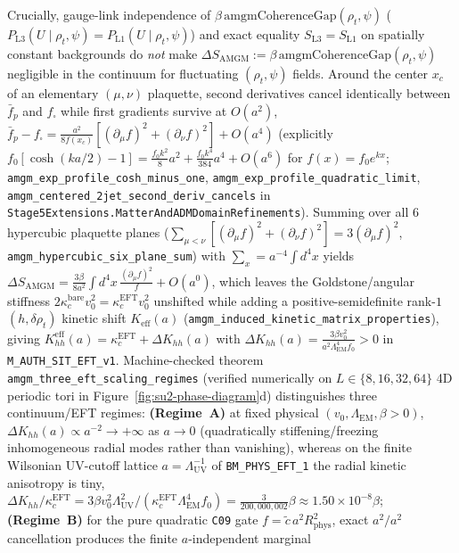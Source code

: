 \begin{enumerate}[leftmargin=2em]
\end{enumerate}

Crucially, gauge-link independence of $\beta\,\mathrm{amgmCoherenceGap}(\rho_t,\psi)$ ($P_{\mathrm{L3}}(U\mid\rho_t,\psi) = P_{\mathrm{L1}}(U\mid\rho_t,\psi)$) and exact equality $S_{\mathrm{L3}} = S_{\mathrm{L1}}$ on spatially constant backgrounds do \emph{not} make $\Delta S_{\mathrm{AMGM}} := \beta\,\mathrm{amgmCoherenceGap}(\rho_t,\psi)$ negligible in the continuum for fluctuating $(\rho_t,\psi)$ fields. Around the center $x_c$ of an elementary $(\mu,\nu)$ plaquette, second derivatives cancel identically between $\bar{f}_p$ and $f_\square$ while first gradients survive at $O(a^2)$, $\bar{f}_p - f_\square = \frac{a^2}{8 f(x_c)}[(\partial_\mu f)^2 + (\partial_\nu f)^2] + O(a^4)$ (explicitly $f_0[\cosh(ka/2)-1] = \frac{f_0 k^2}{8}a^2 + \frac{f_0 k^4}{384}a^4 + O(a^6)$ for $f(x)=f_0 e^{kx}$; \texttt{amgm\_\allowbreak{}exp\_\allowbreak{}profile\_\allowbreak{}cosh\_\allowbreak{}minus\_\allowbreak{}one}, \texttt{amgm\_\allowbreak{}exp\_\allowbreak{}profile\_\allowbreak{}quadratic\_\allowbreak{}limit}, \texttt{amgm\_\allowbreak{}centered\_\allowbreak{}2jet\_\allowbreak{}second\_\allowbreak{}deriv\_\allowbreak{}cancels} in \texttt{Stage5\allowbreak{}Extensions.\allowbreak{}Matter\allowbreak{}And\allowbreak{}ADMDomain\allowbreak{}Refinements}). Summing over all $6$ hypercubic plaquette planes ($\sum_{\mu<\nu}[(\partial_\mu f)^2+(\partial_\nu f)^2] = 3(\partial_\mu f)^2$, \texttt{amgm\_\allowbreak{}hypercubic\_\allowbreak{}six\_\allowbreak{}plane\_\allowbreak{}sum}) with $\sum_x = a^{-4}\int d^4x$ yields $\Delta S_{\mathrm{AMGM}} = \frac{3\beta}{8 a^2}\int d^4x\,\frac{(\partial_\mu f)^2}{f} + O(a^0)$, which leaves the Goldstone/angular stiffness $2\kappa_c^{\mathrm{bare}}v_0^2 = \kappa_c^{\mathrm{EFT}}v_0^2$ unshifted while adding a positive-semidefinite rank-$1$ $(h,\delta\rho_t)$ kinetic shift $K_{\mathrm{eff}}(a)$ (\texttt{amgm\_\allowbreak{}induced\_\allowbreak{}kinetic\_\allowbreak{}matrix\_\allowbreak{}properties}), giving $K_{hh}^{\mathrm{eff}}(a) = \kappa_c^{\mathrm{EFT}} + \Delta K_{hh}(a)$ with $\Delta K_{hh}(a) = \frac{3\beta v_0^2}{a^2 \Lambda_{\mathrm{EM}}^4 f_0} > 0$ in \texttt{M\_AUTH\_SIT\_EFT\_v1}. Machine-checked theorem \texttt{amgm\_\allowbreak{}three\_\allowbreak{}eft\_\allowbreak{}scaling\_\allowbreak{}regimes} (verified numerically on $L\in\{8,16,32,64\}$ 4D periodic tori in Figure~\ref{fig:su2-phase-diagram}d) distinguishes three continuum/EFT regimes: \textbf{(Regime~A)} at fixed physical $(v_0,\Lambda_{\mathrm{EM}},\beta>0)$, $\Delta K_{hh}(a)\propto a^{-2}\to +\infty$ as $a\to 0$ (quadratically stiffening/freezing inhomogeneous radial modes rather than vanishing), whereas on the finite Wilsonian UV-cutoff lattice $a = \Lambda_{\mathrm{UV}}^{-1}$ of \texttt{BM\_PHYS\_EFT\_1} the radial kinetic anisotropy is tiny, $\Delta K_{hh}/\kappa_c^{\mathrm{EFT}} = 3\beta v_0^2\Lambda_{\mathrm{UV}}^2/(\kappa_c^{\mathrm{EFT}}\Lambda_{\mathrm{EM}}^4 f_0) = \frac{3}{200{,}000{,}002}\beta \approx 1.50\times 10^{-8}\beta$; \textbf{(Regime~B)} for the pure quadratic \texttt{C09} gate $f = \tilde{c}\,a^2 R_{\mathrm{phys}}^2$, exact $a^2/a^2$ cancellation produces the finite $a$-independent marginal 